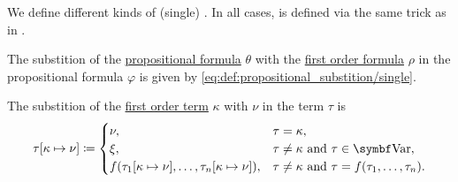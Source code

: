 \begin{definition}\label{def:first_order_substition}
  We define different kinds of (single) . In all cases,  is defined via the same trick as in .

  \begin{DefEnum}
     The substition of the \hyperref[def:propositional_language/formula]{propositional formula} \( \theta \) with the \hyperref[def:first_order_language/formula]{first order formula} \( \rho \) in the propositional formula \( \varphi \) is given by \eqref{eq:def:propositional_substition/single}.

     The substition of the \hyperref[def:first_order_language/term]{first order term} \( \kappa \) with \( \nu \) in the term \( \tau \) is
    \begin{equation}\label{eq:def:first_order_substition/term_in_term}
      \tau[\kappa \mapsto \nu] \coloneqq \begin{cases}
        \nu,                                                               &\tau = \kappa, \\
        \xi,                                                               &\tau \neq \kappa \T{and} \tau \in \Bold{Var}, \\
        f(\tau_1[\kappa \mapsto \nu], \ldots, \tau_n[\kappa \mapsto \nu]), &\tau \neq \kappa \T{and} \tau = f(\tau_1, \ldots, \tau_n).
      \end{cases}
    \end{equation}


\end{DefEnum}
\end{definition}
